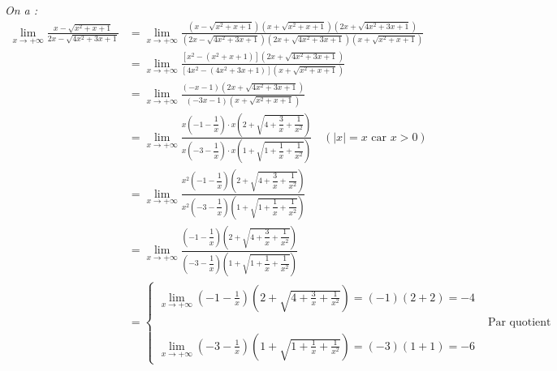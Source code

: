 \documentclass[12pt,a4paper]{article}
\begin{document}
\begin{enumerate}
    \textit{On a :}
    \begin{align*}
        \displaystyle \lim_{x \to +\infty} \frac{x - \sqrt{x^2 + x + 1}}{2x - \sqrt{4x^2 + 3x + 1}} &= \lim_{x \to +\infty} \frac{\left(x - \sqrt{x^2 + x + 1}\right)\left(x + \sqrt{x^2 + x + 1}\right)\left(2x + \sqrt{4x^2 + 3x + 1}\right)}{\left(2x - \sqrt{4x^2 + 3x + 1}\right)\left(2x + \sqrt{4x^2 + 3x + 1}\right)\left(x + \sqrt{x^2 + x + 1}\right)} \\
        &= \lim_{x \to +\infty} \frac{\left[x^2 - (x^2 + x + 1)\right]\left(2x + \sqrt{4x^2 + 3x + 1}\right)}{\left[4x^2 - (4x^2 + 3x + 1)\right]\left(x + \sqrt{x^2 + x + 1}\right)} \\
        &= \lim_{x \to +\infty} \frac{(-x - 1)\left(2x + \sqrt{4x^2 + 3x + 1}\right)}{(-3x - 1)\left(x + \sqrt{x^2 + x + 1}\right)} \\
        &= \lim_{x \to +\infty} \frac{x\left(-1 - \dfrac{1}{x}\right) \cdot x\left(2 + \sqrt{4 + \dfrac{3}{x} + \dfrac{1}{x^2}}\right)}{x\left(-3 - \dfrac{1}{x}\right) \cdot x\left(1 + \sqrt{1 + \dfrac{1}{x} + \dfrac{1}{x^2}}\right)} \quad (|x| = x \text{ car } x > 0) \\
        &= \lim_{x \to +\infty} \frac{x^2\left(-1 - \dfrac{1}{x}\right)\left(2 + \sqrt{4 + \dfrac{3}{x} + \dfrac{1}{x^2}}\right)}{x^2\left(-3 - \dfrac{1}{x}\right)\left(1 + \sqrt{1 + \dfrac{1}{x} + \dfrac{1}{x^2}}\right)} \\
        &= \lim_{x \to +\infty} \frac{\left(-1 - \dfrac{1}{x}\right)\left(2 + \sqrt{4 + \dfrac{3}{x} + \dfrac{1}{x^2}}\right)}{\left(-3 - \dfrac{1}{x}\right)\left(1 + \sqrt{1 + \dfrac{1}{x} + \dfrac{1}{x^2}}\right)} \\
        &= \begin{cases}
    \displaystyle \lim_{x \to +\infty} \left(-1 - \frac{1}{x}\right)\left(2 + \sqrt{4 + \frac{3}{x} + \frac{1}{x^2}}\right) = (-1)(2 + 2) = -4 \\[3mm]
    &\text{ Par quotient }\\
    \displaystyle \lim_{x \to +\infty} \left(-3 - \frac{1}{x}\right)\left(1 + \sqrt{1 + \frac{1}{x} + \frac{1}{x^2}}\right) = (-3)(1 + 1) = -6
    \end{cases}
    \end{align*}
    
    \vspace{0.2cm}
    
     
\end{enumerate}
\end{document}
